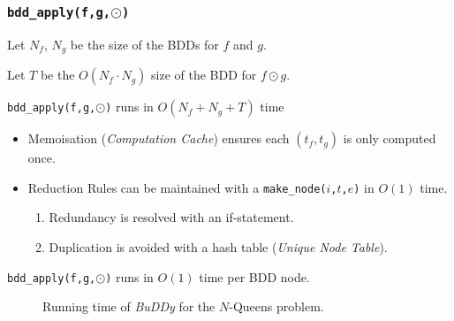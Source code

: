 \documentclass[english, aspectratio=169]{beamer}
\begin{document}
\begin{frame}
  \frametitle{\texttt{bdd\_apply(f,g,$\odot$)}}

  Let $N_f$, $N_g$ be the size of the BDDs for $f$ and $g$.

  Let $T$ be the $O(N_f \cdot N_g)$ size of the BDD for $f \odot g$.

  \begin{theorem}
    \lstinline{bdd_apply(f,g,}$\odot$\lstinline{)} runs in $O(N_f + N_g + T)$
    time
  \end{theorem}
  \begin{itemize}
  \item Memoisation (\emph{Computation Cache}) ensures each $(t_f,t_g)$ is
    only computed once.

  \item Reduction Rules can be maintained with a
    \texttt{make\_node($i$,$t$,$e$)} in $O(1)$ time.
    \begin{enumerate}
    \item Redundancy is resolved with an if-statement.
    \item Duplication is avoided with a hash table (\emph{Unique Node Table}).
    \end{enumerate}
  \end{itemize}

  \begin{corollary}
    \lstinline{bdd_apply(f,g,}$\odot$\lstinline{)} runs in $O(1)$ time per BDD node.
  \end{corollary}
\end{frame}

\blankframe

\begin{frame}
  \begin{figure}
    \centering


    \caption{Running time of \emph{BuDDy} for the $N$-Queens problem.}
  \end{figure}
\end{frame}
\end{document}
